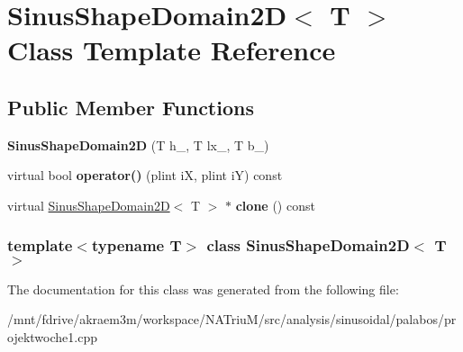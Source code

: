 \hypertarget{classSinusShapeDomain2D}{
\section{SinusShapeDomain2D$<$ T $>$ Class Template Reference}
\label{classSinusShapeDomain2D}
}
\subsection*{Public Member Functions}
\begin{DoxyCompactItemize}
\item 
\hypertarget{classSinusShapeDomain2D_addbd177e19605e50236e76e7b0818cba}{
{\bfseries SinusShapeDomain2D} (T h\_\-, T lx\_\-, T b\_\-)}
\label{classSinusShapeDomain2D_addbd177e19605e50236e76e7b0818cba}

\item 
\hypertarget{classSinusShapeDomain2D_a75f7c95c09b70d3dd90022b8e30c46c4}{
virtual bool {\bfseries operator()} (plint iX, plint iY) const }
\label{classSinusShapeDomain2D_a75f7c95c09b70d3dd90022b8e30c46c4}

\item 
\hypertarget{classSinusShapeDomain2D_a51614872d87ca51c8b789a3199bdf449}{
virtual \hyperlink{classSinusShapeDomain2D}{SinusShapeDomain2D}$<$ T $>$ $\ast$ {\bfseries clone} () const }
\label{classSinusShapeDomain2D_a51614872d87ca51c8b789a3199bdf449}

\end{DoxyCompactItemize}
\subsubsection*{template$<$typename T$>$ class SinusShapeDomain2D$<$ T $>$}



The documentation for this class was generated from the following file:\begin{DoxyCompactItemize}
\item 
/mnt/fdrive/akraem3m/workspace/NATriuM/src/analysis/sinusoidal/palabos/projektwoche1.cpp\end{DoxyCompactItemize}
